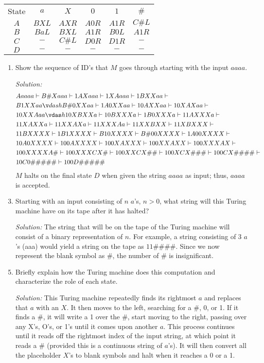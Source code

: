 \documentclass[]{article}
\begin{document}
\begin{enumerate}
\begin{tabular}{c|c|c|c|c|c }
State & $a$   & $X$    & $0$   & $1$   & $\#$   \\
$A$   & $BXL$ & $AXR$  & $A0R$ & $A1R$ & $C\#L$ \\
$B$   & $BaL$ & $BXL$  & $A1R$ & $B0L$ & $A1R$  \\
$C$   & $-$   & $C\#L$ & $D0R$ & $D1R$ & $-$    \\
$D$   & $-$   & $-$    & $-$   & $-$   & $-$
\end{tabular}
\begin{enumerate}
\item Show the sequence of ID's that $M$ goes through starting with the input
$aaaa$.
\item[\emph{Solution:}]
\begin{align*}
&Aaaaa\vdash{B\#Xaaa}\vdash{1AXaaa}\vdash{1XAaaa}\vdash{1BXXaa}\vdash\\&B1XXaa\v
dash{B\#0XXaa}\vdash{1A0XXaa}\vdash{10AXXaa}\vdash{10XAXaa}\vdash\\&10XXAaa\vdas
h{10XBXXa}\vdash{10BXXXa}\vdash{1B0XXXa}\vdash{11AXXXa}\vdash\\&11XAXXa\vdash{11
XXAXa}\vdash{11XXXAa}\vdash{11XXBXX}\vdash{11XBXXX}\vdash\\&11BXXXX\vdash{1B1XXX
X}\vdash{B10XXXX}\vdash{B\#00XXXX}\vdash{1A00XXXX}\vdash\\&10A0XXXX\vdash{100AXX
XX}\vdash{100XAXXX}\vdash{100XXAXX}\vdash{100XXXAX}\vdash\\&100XXXXA\#\vdash{100
XXXCX\#}\vdash{100XXCX\#\#}\vdash{100XCX\#\#\#}\vdash{100CX\#\#\#\#}\vdash\\&10C
0\#\#\#\#\#\vdash{100D\#\#\#\#\#}
\end{align*}
$M$ halts on the final state $D$ when given the string $aaaa$ as input; thus,
$aaaa$ is accepted.

\item Starting with an input consisting of $n$ $a$'s, $n > 0$, what string will
this Turing machine have on its tape after it has halted?
\item[\emph{Solution:}] The string that will be on the tape of the Turing
machine will consist of a binary representation of $n$. For example, a string
consisting of 3 $a$'s (aaa) would yield a string on the tape as $11\#\#\#\#$.
Since we now represent the blank symbol as $\#$, the number of $\#$ is
insignificant.

\item Briefly explain how the Turing machine does this computation and
characterize the role of each state.
\item[\emph{Solution:}] This Turing machine repeatedly finds its rightmost $a$
and replaces that $a$ with an $X$. It then moves to the left, searching for a
$\#$, 0, or 1. If it finds a $\#$, it will write a 1 over the $\#$, start moving
to the right, passing over any X's, O's, or 1's until it comes upon another $a$.
This process continues until it reads off the rightmost index of the input
string, at which point it reads a $\#$ (provided this is a continuous string of
$a$'s). It will then convert all the placeholder $X$'s to blank symbols and halt
when it reaches a 0 or a 1.\\


\end{enumerate}
\end{enumerate}
\end{document}
